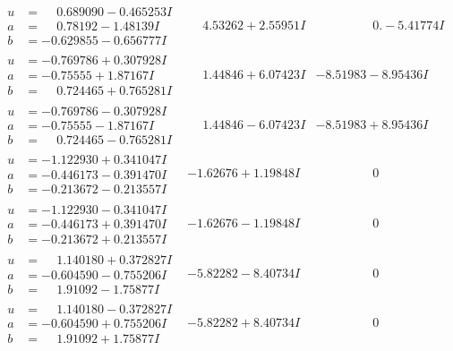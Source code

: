 \documentclass[1p]{elsarticle_modified}
\theoremstyle{definition}
\begin{document}
$$\begin{array}{c|c|c}
\begin{aligned}
u &= \phantom{-}0.689090 - 0.465253 I \\
a &= \phantom{-}0.78192 - 1.48139 I \\
b &= -0.629855 - 0.656777 I\end{aligned}
 & \phantom{-}4.53262 + 2.55951 I & \phantom{-0.000000 } 0. - 5.41774 I \\ \hline\begin{aligned}
u &= -0.769786 + 0.307928 I \\
a &= -0.75555 + 1.87167 I \\
b &= \phantom{-}0.724465 + 0.765281 I\end{aligned}
 & \phantom{-}1.44846 + 6.07423 I & -8.51983 - 8.95436 I \\ \hline\begin{aligned}
u &= -0.769786 - 0.307928 I \\
a &= -0.75555 - 1.87167 I \\
b &= \phantom{-}0.724465 - 0.765281 I\end{aligned}
 & \phantom{-}1.44846 - 6.07423 I & -8.51983 + 8.95436 I \\ \hline\begin{aligned}
u &= -1.122930 + 0.341047 I \\
a &= -0.446173 - 0.391470 I \\
b &= -0.213672 - 0.213557 I\end{aligned}
 & -1.62676 + 1.19848 I & \phantom{-0.000000 } 0 \\ \hline\begin{aligned}
u &= -1.122930 - 0.341047 I \\
a &= -0.446173 + 0.391470 I \\
b &= -0.213672 + 0.213557 I\end{aligned}
 & -1.62676 - 1.19848 I & \phantom{-0.000000 } 0 \\ \hline\begin{aligned}
u &= \phantom{-}1.140180 + 0.372827 I \\
a &= -0.604590 - 0.755206 I \\
b &= \phantom{-}1.91092 - 1.75877 I\end{aligned}
 & -5.82282 - 8.40734 I & \phantom{-0.000000 } 0 \\ \hline\begin{aligned}
u &= \phantom{-}1.140180 - 0.372827 I \\
a &= -0.604590 + 0.755206 I \\
b &= \phantom{-}1.91092 + 1.75877 I\end{aligned}
 & -5.82282 + 8.40734 I & \phantom{-0.000000 } 0 \\ \hline\begin{aligned}

\end{aligned}
\end{array}$$
\end{document}
